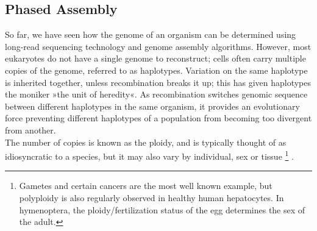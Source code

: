 \subsection*{Phased Assembly}

So far, we have seen how the genome of an organism can be determined using long-read sequencing technology and genome assembly algorithms.
However, most eukaryotes do not have a single genome to reconstruct; cells often carry multiple copies of the genome, referred to as haplotypes.
Variation on the same haplotype is inherited together, unless recombination breaks it up; this has given haplotypes the moniker »the unit of heredity«.
As recombination switches genomic sequence between different haplotypes in the same organism, it provides an evolutionary force preventing different haplotypes of a population from becoming too divergent from another\cite{renkawitz14, penalba20}. \\%
The number of copies is known as the ploidy, and is typically thought of as idiosyncratic to a species, but it may also vary by individual, sex or tissue
\footnote{Gametes and certain cancers are the most well known example, but polyploidy is also regularly observed in healthy human hepatocytes.
In hymenoptera, the ploidy/fertilization status of the egg determines the sex of the adult.}
.

